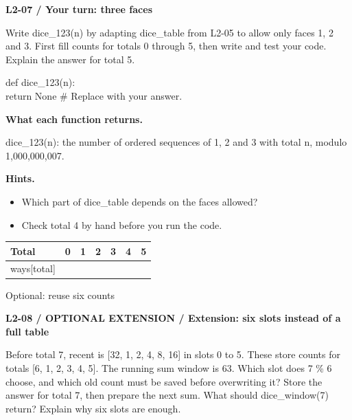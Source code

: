 \documentclass[11pt,a4paper]{article}
\begin{document}
\par\noindent\begin{minipage}{\linewidth}
\textbf{L2-07 / Your turn: three faces}\par\smallskip Write dice\_123(n) by adapting dice\_table from L2-05 to allow only faces 1, 2 and 3. First fill counts for totals 0 through 5, then write and test your code. Explain the answer for total 5.\par
\par{}\par\smallskip\noindent\colorbox{codepaper}{\parbox{\dimexpr\linewidth-2\fboxsep\relax}{\small\ttfamily\raggedright def dice\_123(n):\\\hspace*{2.4em}return None  \# Replace with your answer.}}\par
{\small\textbf{What each function returns.}\par dice\_123(n): the number of ordered sequences of 1, 2 and 3 with total n, modulo 1,000,000,007.\par }
{\small\textbf{Hints.}}\begin{itemize}\item Which part of dice\_table depends on the faces allowed?\item Check total 4 by hand before you run the code.\end{itemize}
\par\medskip \begingroup\small\setlength{\tabcolsep}{4pt}\renewcommand{\arraystretch}{1.35}\begin{tabularx}{\linewidth}{>{\raggedright\arraybackslash}l>{\raggedright\arraybackslash}X>{\raggedright\arraybackslash}X>{\raggedright\arraybackslash}X>{\raggedright\arraybackslash}X>{\raggedright\arraybackslash}X>{\raggedright\arraybackslash}X}\toprule\textbf{Total} & \textbf{0} & \textbf{1} & \textbf{2} & \textbf{3} & \textbf{4} & \textbf{5}\\\midrule
ways[total] & 1 &  &  &  &  & \\
\bottomrule\end{tabularx}\endgroup\par\medskip 
\end{minipage}\par\vspace{4mm}
\par\noindent\begin{minipage}{\linewidth}
{\heavy\fontsize{12}{15}\selectfont Optional: reuse six counts\par}\medskip
\textbf{L2-08 / OPTIONAL EXTENSION / Extension: six slots instead of a full table}\par\smallskip Before total 7, recent is [32, 1, 2, 4, 8, 16] in slots 0 to 5. These store counts for totals [6, 1, 2, 3, 4, 5]. The running sum window is 63. Which slot does 7 \% 6 choose, and which old count must be saved before overwriting it? Store the answer for total 7, then prepare the next sum. What should dice\_window(7) return? Explain why six slots are enough.\par
\end{minipage}\par\vspace{4mm}
\end{document}
